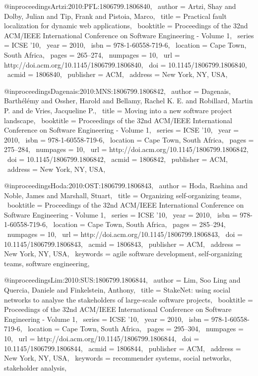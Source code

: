 @inproceedings{Artzi:2010:PFL:1806799.1806840,
 author = {Artzi, Shay and Dolby, Julian and Tip, Frank and Pistoia, Marco},
 title = {Practical fault localization for dynamic web applications},
 booktitle = {Proceedings of the 32nd ACM/IEEE International Conference on Software Engineering - Volume 1},
 series = {ICSE '10},
 year = {2010},
 isbn = {978-1-60558-719-6},
 location = {Cape Town, South Africa},
 pages = {265--274},
 numpages = {10},
 url = {http://doi.acm.org/10.1145/1806799.1806840},
 doi = {10.1145/1806799.1806840},
 acmid = {1806840},
 publisher = {ACM},
 address = {New York, NY, USA},
} 

@inproceedings{Dagenais:2010:MNS:1806799.1806842,
 author = {Dagenais, Barth{\'e}l{\'e}my and Ossher, Harold and Bellamy, Rachel K. E. and Robillard, Martin P. and de Vries, Jacqueline P.},
 title = {Moving into a new software project landscape},
 booktitle = {Proceedings of the 32nd ACM/IEEE International Conference on Software Engineering - Volume 1},
 series = {ICSE '10},
 year = {2010},
 isbn = {978-1-60558-719-6},
 location = {Cape Town, South Africa},
 pages = {275--284},
 numpages = {10},
 url = {http://doi.acm.org/10.1145/1806799.1806842},
 doi = {10.1145/1806799.1806842},
 acmid = {1806842},
 publisher = {ACM},
 address = {New York, NY, USA},
} 

@inproceedings{Hoda:2010:OST:1806799.1806843,
 author = {Hoda, Rashina and Noble, James and Marshall, Stuart},
 title = {Organizing self-organizing teams},
 booktitle = {Proceedings of the 32nd ACM/IEEE International Conference on Software Engineering - Volume 1},
 series = {ICSE '10},
 year = {2010},
 isbn = {978-1-60558-719-6},
 location = {Cape Town, South Africa},
 pages = {285--294},
 numpages = {10},
 url = {http://doi.acm.org/10.1145/1806799.1806843},
 doi = {10.1145/1806799.1806843},
 acmid = {1806843},
 publisher = {ACM},
 address = {New York, NY, USA},
 keywords = {agile software development, self-organizing teams, software engineering},
} 

@inproceedings{Lim:2010:SUS:1806799.1806844,
 author = {Lim, Soo Ling and Quercia, Daniele and Finkelstein, Anthony},
 title = {StakeNet: using social networks to analyse the stakeholders of large-scale software projects},
 booktitle = {Proceedings of the 32nd ACM/IEEE International Conference on Software Engineering - Volume 1},
 series = {ICSE '10},
 year = {2010},
 isbn = {978-1-60558-719-6},
 location = {Cape Town, South Africa},
 pages = {295--304},
 numpages = {10},
 url = {http://doi.acm.org/10.1145/1806799.1806844},
 doi = {10.1145/1806799.1806844},
 acmid = {1806844},
 publisher = {ACM},
 address = {New York, NY, USA},
 keywords = {recommender systems, social networks, stakeholder analysis},
} 

